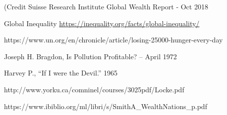 \documentclass[11pt]{article}
\begin{document}
\begin{multicols}{2}
\begin{thebibliography}{9}
	{\footnotesize
	 (Credit Suisse Research Institute Global Wealth Report - Oct 2018
	
	 Global Inequality \url{https://inequality.org/facts/global-inequality/}
		
	 https://www.un.org/en/chronicle/article/losing-25000-hunger-every-day
	
	 Joseph H. Bragdon, Is Pollution Profitable? – April 1972
	
	 Harvey P., ``If I were the Devil.'' 1965
	
	 http://www.yorku.ca/comninel/courses/3025pdf/Locke.pdf
	
	 https://www.ibiblio.org/ml/libri/s/SmithA\_WealthNations\_p.pdf
	}
\end{thebibliography}
\end{multicols}


\end{document}
